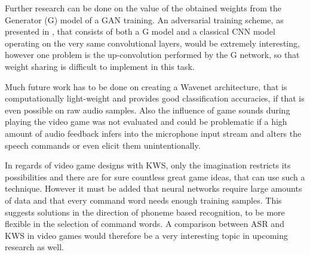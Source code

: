 Further research can be done on the value of the obtained weights from the Generator (G) model of a GAN training. 
An adversarial training scheme, as presented in \cite{Oezdenizci2020}, that consists of both a G model and a classical CNN model operating on the very same convolutional layers, would be extremely interesting, however one problem is the up-convolution performed by the G network, so that weight sharing is difficult to implement in this task.

Much future work has to be done on creating a Wavenet architecture, that is computationally light-weight and provides good classification accuracies, if that is even possible on raw audio samples.
Also the influence of game sounds during playing the video game was not evaluated and could be problematic if a high amount of audio feedback infers into the microphone input stream and alters the speech commands or even elicit them unintentionally.

In regards of video game designs with KWS, only the imagination restricts its possibilities and there are for sure countless great game ideas, that can use such a technique.
However it must be added that neural networks require large amounts of data and that every command word needs enough training samples.
This suggests solutions in the direction of phoneme based recognition, to be more flexible in the selection of command words.
A comparison between ASR and KWS in video games would therefore be a very interesting topic in upcoming research as well.
